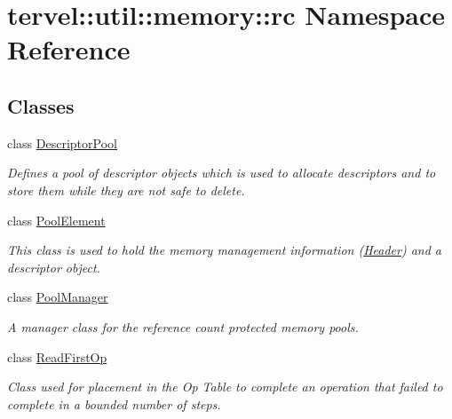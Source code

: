 \hypertarget{namespacetervel_1_1util_1_1memory_1_1rc}{}\section{tervel\+:\+:util\+:\+:memory\+:\+:rc Namespace Reference}
\label{namespacetervel_1_1util_1_1memory_1_1rc}
\subsection*{Classes}
\begin{DoxyCompactItemize}
\item 
class \hyperlink{classtervel_1_1util_1_1memory_1_1rc_1_1_descriptor_pool}{Descriptor\+Pool}
\begin{DoxyCompactList}\small\item\em Defines a pool of descriptor objects which is used to allocate descriptors and to store them while they are not safe to delete. \end{DoxyCompactList}\item 
class \hyperlink{classtervel_1_1util_1_1memory_1_1rc_1_1_pool_element}{Pool\+Element}
\begin{DoxyCompactList}\small\item\em This class is used to hold the memory management information (\hyperlink{structtervel_1_1util_1_1memory_1_1rc_1_1_pool_element_1_1_header}{Header}) and a descriptor object. \end{DoxyCompactList}\item 
class \hyperlink{classtervel_1_1util_1_1memory_1_1rc_1_1_pool_manager}{Pool\+Manager}
\begin{DoxyCompactList}\small\item\em A manager class for the reference count protected memory pools. \end{DoxyCompactList}\item 
class \hyperlink{classtervel_1_1util_1_1memory_1_1rc_1_1_read_first_op}{Read\+First\+Op}
\begin{DoxyCompactList}\small\item\em Class used for placement in the Op Table to complete an operation that failed to complete in a bounded number of steps. \end{DoxyCompactList}\end{DoxyCompactItemize}
